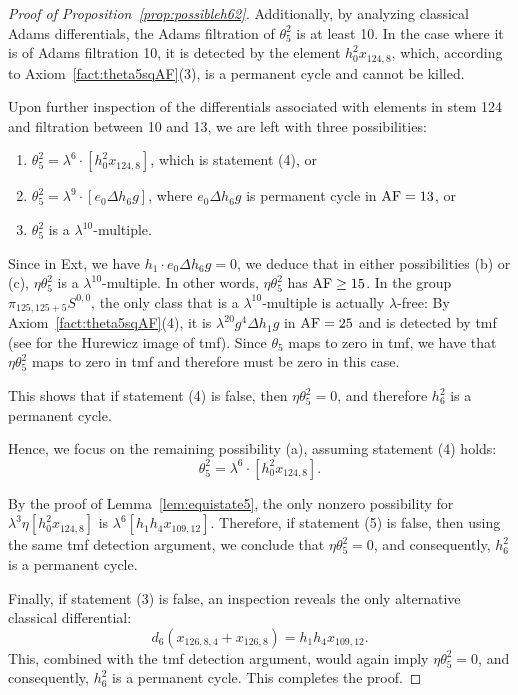 \begin{proof}[Proof of Proposition~\ref{prop:possibleh62}]
Additionally, by analyzing classical Adams differentials, the Adams filtration of $\theta_5^2$ is at least 10. In the case where it is of Adams filtration 10, it is detected by the element $h_0^2 x_{124,8}$, which, according to Axiom~\ref{fact:theta5sqAF}(3), is a permanent cycle and cannot be killed. 

Upon further inspection of the differentials associated with elements in stem 124 and filtration between 10 and 13, we are left with three possibilities:
\begin{enumerate}
    \item $\theta_5^2 = \lambda^6 \cdot [h_0^2 x_{124,8}]$, which is statement (4), or
    \item $\theta_5^2 = \lambda^9 \cdot [e_0 \Delta h_6 g]$, where $e_0 \Delta h_6 g$ is permanent cycle in $\mathrm{AF}=13$, or
    \item $\theta_5^2$ is a $\lambda^{10}$-multiple.
\end{enumerate}

Since in Ext, we have $h_1 \cdot e_0 \Delta h_6 g = 0$, we deduce that in either possibilities (b) or (c), $\eta \theta_5^2$ is a $\lambda^{10}$-multiple. In other words, $\eta \theta_5^2$ has $\mathrm{AF} \ge 15$. In the group $\pi_{125,125+5} S^{0,0}$, the only class that is a $\lambda^{10}$-multiple is actually $\lambda$-free: By Axiom~\ref{fact:theta5sqAF}(4), it is $\lambda^{20} g^4 \Delta h_1 g$ in $\mathrm{AF}=25$ and is detected by tmf (see \cite{tmf} for the Hurewicz image of tmf). Since $\theta_5$ maps to zero in tmf, we have that $\eta \theta_5^2$ maps to zero in tmf and therefore must be zero in this case. 

This shows that if statement (4) is false, then $\eta \theta_5^2 = 0$, and therefore $h_6^2$ is a permanent cycle.

Hence, we focus on the remaining possibility (a), assuming statement (4) holds:
$$\theta_5^2 = \lambda^6 \cdot [h_0^2 x_{124,8}].$$

By the proof of Lemma~\ref{lem:equistate5}, the only nonzero possibility for $\lambda^3 \eta [h_0^2x_{124,8}]$ is $\lambda^6 [h_1h_4x_{109,12}]$. Therefore, if statement (5) is false, then using the same tmf detection argument, we conclude that $\eta \theta_5^2 = 0$, and consequently, $h_6^2$ is a permanent cycle.

Finally, if statement (3) is false, an inspection reveals the only alternative classical differential:
$$d_6(x_{126,8,4} + x_{126,8}) = h_1h_4x_{109,12}.$$
This, combined with the tmf detection argument, would again imply $\eta \theta_5^2 = 0$, and consequently, $h_6^2$ is a permanent cycle. This completes the proof.
\end{proof}

